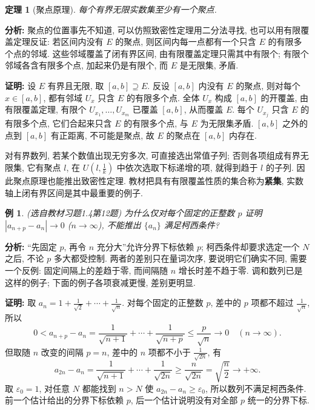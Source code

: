 \documentclass[UTF8,openany]{ctexbook}
\theoremstyle{chinesetextbook}
\newtheorem{example}{例}[section]
\newtheorem{theorem}{定理}[section]
\newenvironment{cnproof}{\par\indent\textbf{证明:} \ignorespaces}{\par}
\begin{document}
\begin{theorem}[聚点原理]
每个有界无限实数集至少有一个聚点.
\end{theorem}
\par\indent\textbf{分析:} 聚点的位置事先不知道, 可以仿照致密性定理用二分法寻找, 也可以用有限覆盖定理反证: 若区间内没有 $E$ 的聚点, 则区间内每一点都有一个只含 $E$ 的有限多个点的邻域. 这些邻域覆盖了闭有界区间, 由有限覆盖定理只需其中有限个; 有限个邻域各含有限多个点, 加起来仍是有限个, 而 $E$ 是无限集, 矛盾.
\begin{cnproof}
设 $E$ 有界且无限, 取 $[a,b]\supseteq E$. 反设 $[a,b]$ 内没有 $E$ 的聚点, 则对每个 $x\in[a,b]$, 都有邻域 $U_x$ 只含 $E$ 的有限多个点. 全体 $U_x$ 构成 $[a,b]$ 的开覆盖, 由有限覆盖定理, 有限个 $U_{x_1},\ldots,U_{x_m}$ 已覆盖 $[a,b]$, 从而覆盖 $E$. 每个 $U_{x_j}$ 只含 $E$ 的有限多个点, 它们合起来只含 $E$ 的有限多个点, 与 $E$ 为无限集矛盾. $[a,b]$ 之外的点到 $[a,b]$ 有正距离, 不可能是聚点, 故 $E$ 的聚点在 $[a,b]$ 内存在.
\end{cnproof}
对有界数列, 若某个数值出现无穷多次, 可直接选出常值子列; 否则各项组成有界无限集, 它有聚点 $l$, 在 $\displaystyle U\left(l,\frac1k\right)$ 中依次选取下标递增的项, 就得到趋于 $l$ 的子列. 因此聚点原理也能推出致密性定理. 教材把具有有限覆盖性质的集合称为\textbf{紧集}, 实数轴上闭有界区间是其中最重要的例子.
\begin{example}
\textnormal{(选自教材习题1.4第12题)} 为什么仅对每个固定的正整数 $p$ 证明 $|a_{n+p}-a_n|\to0$ ($n\to\infty$), 不能推出 $\{a_n\}$ 满足柯西条件?
\end{example}
\par\indent\textbf{分析:} “先固定 $p$, 再令 $n$ 充分大”允许分界下标依赖 $p$; 柯西条件却要求选定一个 $N$ 之后, 不论 $p$ 多大都受控制. 两者的差别只在量词次序, 要说明它们确实不同, 需要一个反例: 固定间隔上的差趋于零, 而间隔随 $n$ 增长时差不趋于零. 调和数列已是这样的例子; 下面的例子各项衰减更慢, 差别更明显.
\begin{cnproof}
取 $\displaystyle a_n=1+\frac1{\sqrt2}+\cdots+\frac1{\sqrt n}$. 对每个固定的正整数 $p$, 差中的 $p$ 项都不超过 $\displaystyle\frac1{\sqrt n}$, 所以
\[
0<a_{n+p}-a_n=\frac1{\sqrt{n+1}}+\cdots+\frac1{\sqrt{n+p}}\le\frac p{\sqrt n}\to0\quad(n\to\infty).
\]
但取随 $n$ 改变的间隔 $p=n$, 差中的 $n$ 项都不小于 $\displaystyle\frac1{\sqrt{2n}}$, 有
\[
a_{2n}-a_n=\frac1{\sqrt{n+1}}+\cdots+\frac1{\sqrt{2n}}
\ge\frac n{\sqrt{2n}}=\sqrt{\frac n2}\to+\infty.
\]
取 $\varepsilon_0=1$, 对任意 $N$ 都能找到 $n>N$ 使 $a_{2n}-a_n\ge\varepsilon_0$, 所以数列不满足柯西条件. 前一个估计给出的分界下标依赖 $p$, 后一个估计说明没有对全部 $p$ 统一的分界下标.
\end{cnproof}
\end{document}

